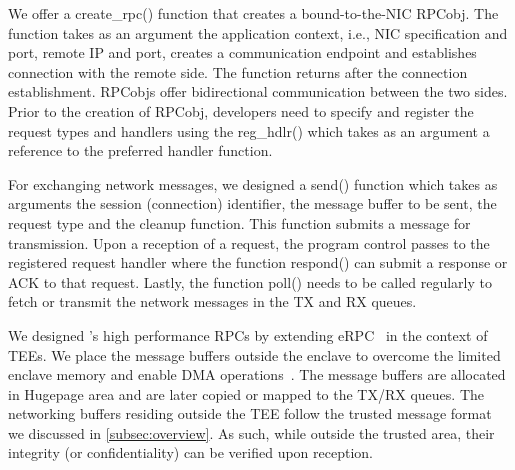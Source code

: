  We offer a create\_rpc() function that creates a bound-to-the-NIC RPCobj. The function takes as an argument the application context, i.e., NIC specification and port, remote IP and port, creates a communication endpoint and establishes connection with the remote side. The function returns after the connection establishment. RPCobjs offer bidirectional communication between the two sides. Prior to the creation of RPCobj, developers need to specify and register the request types and handlers using the reg\_hdlr() which takes as an argument a reference to the preferred handler function. %

For exchanging network messages, we designed a send() function which takes as arguments the session (connection) identifier, the message buffer to be sent, the request type and the cleanup function. This function submits a message for transmission. Upon a reception of a request, the program control passes to the registered request handler where the function respond() can submit a response or ACK to that request. Lastly, the function poll() needs to be called regularly to fetch or transmit the network messages in the TX and RX queues.




\fi 
\begin{comment}
~\footnote{DMA mappings are prohibited in the trusted area of a TEE as this violates TEE's security properties~\cite{intel-sgx, avocado, treaty}}
\end{comment}

We designed \projecttitle{}'s high performance RPCs by extending eRPC~\cite{erpc} in the context of TEEs. We place the message buffers outside the enclave to overcome the limited enclave memory and enable DMA operations~\cite{intel-sgx, avocado, treaty}. The message buffers are allocated in Hugepage area and are later copied or mapped to the TX/RX queues. The networking buffers residing outside the TEE follow the trusted message format we discussed in \ref{subsec:overview}. As such, while outside the trusted area, their integrity (or confidentiality) can be verified upon reception.

